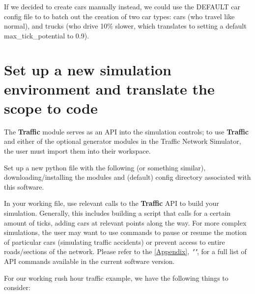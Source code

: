 \noindent If we decided to create cars manually instead, we could use the DEFAULT car config file to to batch out the creation of two car types:  cars (who travel like normal), and trucks (who drive 10\% slower, which translates to setting a default max\_tick\_potential to 0.9).

\section{Set up a new simulation environment and translate the scope to code }

\par The \textbf{Traffic} module serves as an API into the simulation controls; to use \textbf{Traffic} and either of the optional generator modules in the Traffic Network Simulator, the user must import them into their workspace. \\

\par Set up a new python file with the following (or something similar), downloading/installing the modules and (default) config directory associated with this software. \\

\par In your working file, use relevant calls to the \textbf{Traffic} API to build your simulation.  Generally, this includes building a script that calls for a certain amount of ticks, adding cars at relevant points along the way.  For more complex simulations, the user may want to use commands to pause or resume the motion of particular cars (simulating traffic accidents) or prevent access to entire roads/sections of the network.  Please refer to the \autoref{Appendix}, \textit{""}, for a full list of API commands available in the current software version. \\

\par For our working rush hour traffic example, we have the following things to consider:

